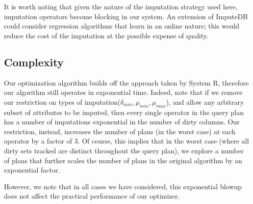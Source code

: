It is worth noting that given the nature of the imputation strategy used here, imputation
operators become blocking in our system. An extension of ImputeDB could consider regression
algorithms that learn in an online nature; this would reduce the cost of the imputation at
the possible expense of quality.

\begin{algorithm}
    
\end{algorithm}


\subsection{Complexity}
Our optimization algorithm builds off the approach taken by System R\cite{blasgen1981system}, therefore our algorithm still operates in exponential time. Indeed, 
note that if we remove our restriction on types of imputation($\delta_{min}, \mu_{min}, \mu_{max}$), and allow any arbitrary subset of attributes to be imputed,
then every single operator in the query plan has a number of imputations exponential in the number of dirty columns. Our restriction, instead, increases the number
of plans (in the worst case) at each operator by a factor of 3. Of course, this implies that in the worst case (where all dirty sets tracked are distinct throughout the query plan),
we explore a number of plans that further scales the number of plans in the original algorithm by an exponential factor.

However, we note that in all cases we have considered, this exponential blowup does not affect the practical performance of our optimizer.

